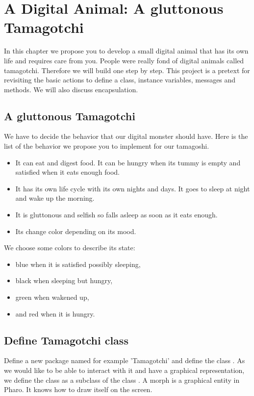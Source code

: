\documentclass[10pt,twoside,english]{_support/latex/sbabook/sbabook}
\begin{document}
\frontmatter
\pagestyle{plain}

\tableofcontents*
\clearpage\listoffigures

\mainmatter

\chapter{A Digital Animal: A gluttonous Tamagotchi}
In this chapter we propose you to develop a small digital animal that has its own life and requires care from you. People were really fond of digital animals called tamagotchi. Therefore  we will build one step by step. This project is a pretext for revisiting the basic actions to define a class, instance variables, messages and methods. We will also discuss encapsulation.
\section{A gluttonous Tamagotchi}
We have to decide the behavior that our digital monster should have.
Here is the list of the behavior we propose you to implement for our  tamagoshi. 

\begin{itemize}
\item It can eat and digest food. It can be hungry when its tummy is empty and satisfied when it eats enough food.
\item It has its own life cycle with its own nights and days. It goes to sleep at night and wake up the morning.
\item It is gluttonous and selfish so falls asleep as soon as it eats enough.
\item Its change color depending on its mood.
\end{itemize}

We choose some colors to describe its state: 

\begin{itemize}
\item blue when it is satisfied possibly sleeping, 
\item black when sleeping but hungry, 
\item green when wakened up,
\item and red when it is hungry.
\end{itemize}
\section{Define Tamagotchi class}
Define a new package named for example 'Tamagotchi' and define the class . As we would like to be able to interact with it and have a graphical representation, we define  the class  as a subclass of the class . A morph is a graphical entity in Pharo. It knows how to draw itself on the screen. 
\end{document}
